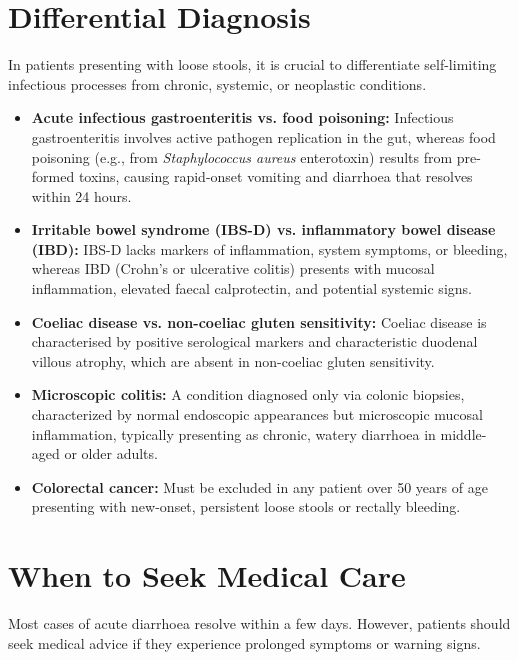 \section*{Differential Diagnosis}
In patients presenting with loose stools, it is crucial to differentiate self-limiting infectious processes from chronic, systemic, or neoplastic conditions.
\begin{itemize}
    \item \textbf{Acute infectious gastroenteritis vs. food poisoning:} Infectious gastroenteritis involves active pathogen replication in the gut, whereas food poisoning (e.g., from \textit{Staphylococcus aureus} enterotoxin) results from pre-formed toxins, causing rapid-onset vomiting and diarrhoea that resolves within 24 hours.
    \item \textbf{Irritable bowel syndrome (IBS-D) vs. inflammatory bowel disease (IBD):} IBS-D lacks markers of inflammation, system symptoms, or bleeding, whereas IBD (Crohn's or ulcerative colitis) presents with mucosal inflammation, elevated faecal calprotectin, and potential systemic signs.
    \item \textbf{Coeliac disease vs. non-coeliac gluten sensitivity:} Coeliac disease is characterised by positive serological markers and characteristic duodenal villous atrophy, which are absent in non-coeliac gluten sensitivity.
    \item \textbf{Microscopic colitis:} A condition diagnosed only via colonic biopsies, characterized by normal endoscopic appearances but microscopic mucosal inflammation, typically presenting as chronic, watery diarrhoea in middle-aged or older adults.
    \item \textbf{Colorectal cancer:} Must be excluded in any patient over 50 years of age presenting with new-onset, persistent loose stools or rectally bleeding.
\end{itemize}

\section*{When to Seek Medical Care}
Most cases of acute diarrhoea resolve within a few days. However, patients should seek medical advice if they experience prolonged symptoms or warning signs.

